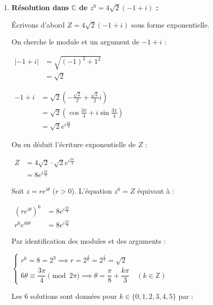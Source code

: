 \documentclass[12pt,a4paper]{article}
\begin{document}
\begin{enumerate}
    \item \textbf{Résolution dans $\mathbb{C}$ de $z^6 = 4\sqrt{2}(-1 + i)$ :}
    
    Écrivons d'abord $Z = 4\sqrt{2}(-1 + i)$ sous forme exponentielle.
    
    On cherche le module et un argument de $-1 + i$ :
    
    $
    \begin{aligned}
        |-1 + i| &= \sqrt{(-1)^2 + 1^2}\\
        &= \sqrt{2}
    \end{aligned}
    $
    
    $
    \begin{aligned}
        -1 + i &= \sqrt{2}\left(-\frac{\sqrt{2}}{2} + \frac{\sqrt{2}}{2}i\right)\\
        &= \sqrt{2}\left(\cos\frac{3\pi}{4} + i\sin\frac{3\pi}{4}\right)\\
        &= \sqrt{2}e^{i\frac{3\pi}{4}}
    \end{aligned}
    $
    
    On en déduit l'écriture exponentielle de $Z$ :
    
    $
    \begin{aligned}
        Z &= 4\sqrt{2} \cdot \sqrt{2}e^{i\frac{3\pi}{4}}\\
        &= 8e^{i\frac{3\pi}{4}}
    \end{aligned}
    $
    
    Soit $z = r e^{i\theta}$ ($r > 0$). L'équation $z^6 = Z$ équivaut à :
    
    $
    \begin{aligned}
        \left(r e^{i\theta}\right)^6 &= 8e^{i\frac{3\pi}{4}}\\
        r^6 e^{i6\theta} &= 8e^{i\frac{3\pi}{4}}
    \end{aligned}
    $
    
    Par identification des modules et des arguments :
    
    $
    \begin{cases}
        r^6 = 8 = 2^3 \implies r = 2^{\frac{3}{6}} = 2^{\frac{1}{2}} = \sqrt{2} \\
        6\theta \equiv \dfrac{3\pi}{4} \pmod{2\pi} \implies \theta = \dfrac{\pi}{8} + \dfrac{k\pi}{3} \quad (k \in \mathbb{Z})
    \end{cases}
    $
    
    Les $6$ solutions sont données pour $k \in \{0, 1, 2, 3, 4, 5\}$ par :
    

\end{enumerate}
\end{document}
